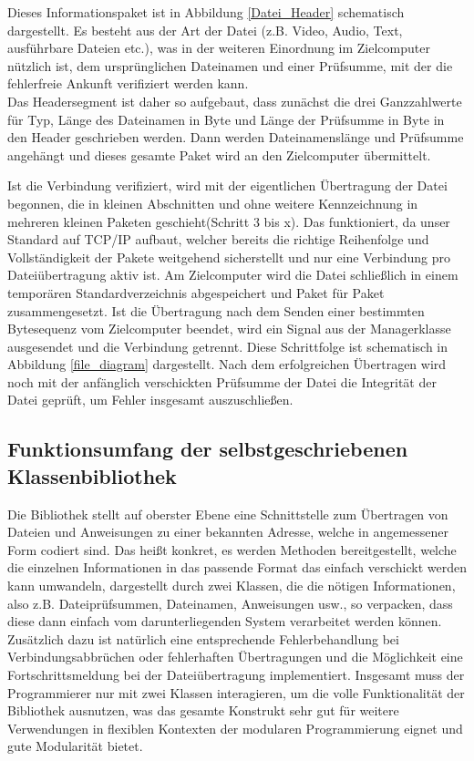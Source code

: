 Dieses Informationspaket ist in Abbildung \ref{Datei_Header} schematisch dargestellt.
Es besteht aus der Art der Datei (z.B. Video, Audio, Text, ausführbare Dateien etc.), was in der weiteren Einordnung im Zielcomputer nützlich ist, dem ursprünglichen Dateinamen und einer Prüfsumme, mit der die fehlerfreie Ankunft verifiziert werden kann.\\
Das Headersegment ist daher so aufgebaut, dass zunächst die drei Ganzzahlwerte für Typ, Länge des Dateinamen in Byte und Länge der Prüfsumme in Byte in den Header geschrieben werden. Dann werden Dateinamenslänge und Prüfsumme angehängt und dieses gesamte Paket wird an den Zielcomputer übermittelt.\par
Ist die Verbindung verifiziert, wird mit der eigentlichen Übertragung der Datei begonnen, die in kleinen Abschnitten und ohne weitere Kennzeichnung in mehreren kleinen Paketen geschieht(Schritt 3 bis x).
Das funktioniert, da unser Standard auf TCP/IP aufbaut, welcher bereits die richtige Reihenfolge und Vollständigkeit der Pakete weitgehend sicherstellt und nur eine Verbindung pro Dateiübertragung aktiv ist.
Am Zielcomputer wird die Datei schließlich in einem temporären Standardverzeichnis abgespeichert und Paket für Paket zusammengesetzt.
Ist die Übertragung nach dem Senden einer bestimmten Bytesequenz vom Zielcomputer beendet, wird ein Signal aus der Managerklasse ausgesendet und die Verbindung getrennt.
Diese Schrittfolge ist schematisch in Abbildung \ref{file_diagram} dargestellt.
Nach dem erfolgreichen Übertragen wird noch mit der anfänglich verschickten Prüfsumme der Datei die Integrität der Datei geprüft, um Fehler insgesamt auszuschließen.

\subsection{Funktionsumfang der selbstgeschriebenen Klassenbibliothek}
Die Bibliothek stellt auf oberster Ebene eine Schnittstelle zum Übertragen von Dateien und Anweisungen zu einer bekannten Adresse, welche in angemessener Form codiert sind.
Das heißt konkret, es werden Methoden bereitgestellt, welche die einzelnen Informationen in das passende Format das einfach verschickt werden kann umwandeln, dargestellt durch zwei Klassen, die die nötigen Informationen, also z.B. Dateiprüfsummen, Dateinamen, Anweisungen usw., so verpacken, dass diese dann einfach vom darunterliegenden System verarbeitet werden können.
Zusätzlich dazu ist natürlich eine entsprechende Fehlerbehandlung bei Verbindungsabbrüchen oder fehlerhaften Übertragungen und die Möglichkeit eine Fortschrittsmeldung bei der Dateiübertragung implementiert.
Insgesamt muss der Programmierer nur mit zwei Klassen interagieren, um die volle Funktionalität der Bibliothek ausnutzen, was das gesamte Konstrukt sehr gut für weitere Verwendungen in flexiblen Kontexten der modularen Programmierung eignet und gute Modularität bietet.

